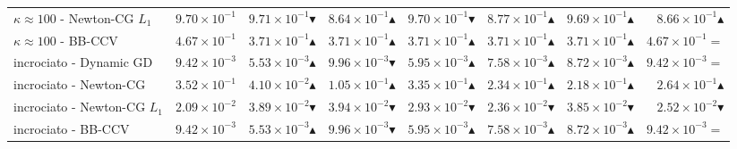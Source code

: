 \begin{table}[H]
\begin{tabular}{@{}lrrrrrrr@{}}
$\kappa\approx100$ - Newton-CG $L_1$ & $9.70\times10^{-1}$ & $9.71\times10^{-1}$$\blacktriangledown$ & $8.64\times10^{-1}$$\blacktriangle$ & $9.70\times10^{-1}$$\blacktriangledown$ & $8.77\times10^{-1}$$\blacktriangle$ & $9.69\times10^{-1}$$\blacktriangle$ & $8.66\times10^{-1}$$\blacktriangle$\\

$\kappa\approx100$ - BB-CCV & $4.67\times10^{-1}$ & $3.71\times10^{-1}$$\blacktriangle$ & $3.71\times10^{-1}$$\blacktriangle$ & $3.71\times10^{-1}$$\blacktriangle$ & $3.71\times10^{-1}$$\blacktriangle$ & $3.71\times10^{-1}$$\blacktriangle$ & $4.67\times10^{-1}$$=$\\

\midrule

incrociato - Dynamic GD & $9.42\times10^{-3}$ & $5.53\times10^{-3}$$\blacktriangle$ & $9.96\times10^{-3}$$\blacktriangledown$ & $5.95\times10^{-3}$$\blacktriangle$ & $7.58\times10^{-3}$$\blacktriangle$ & $8.72\times10^{-3}$$\blacktriangle$ & $9.42\times10^{-3}$$=$\\

incrociato - Newton-CG & $3.52\times10^{-1}$ & $4.10\times10^{-2}$$\blacktriangle$ & $1.05\times10^{-1}$$\blacktriangle$ & $3.35\times10^{-1}$$\blacktriangle$ & $2.34\times10^{-1}$$\blacktriangle$ & $2.18\times10^{-1}$$\blacktriangle$ & $2.64\times10^{-1}$$\blacktriangle$\\

incrociato - Newton-CG $L_1$ & $2.09\times10^{-2}$ & $3.89\times10^{-2}$$\blacktriangledown$ & $3.94\times10^{-2}$$\blacktriangledown$ & $2.93\times10^{-2}$$\blacktriangledown$ & $2.36\times10^{-2}$$\blacktriangledown$ & $3.85\times10^{-2}$$\blacktriangledown$ & $2.52\times10^{-2}$$\blacktriangledown$\\

incrociato - BB-CCV & $9.42\times10^{-3}$ & $5.53\times10^{-3}$$\blacktriangle$ & $9.96\times10^{-3}$$\blacktriangledown$ & $5.95\times10^{-3}$$\blacktriangle$ & $7.58\times10^{-3}$$\blacktriangle$ & $8.72\times10^{-3}$$\blacktriangle$ & $9.42\times10^{-3}$$=$\\

\bottomrule

\end{tabular}

\end{table}




